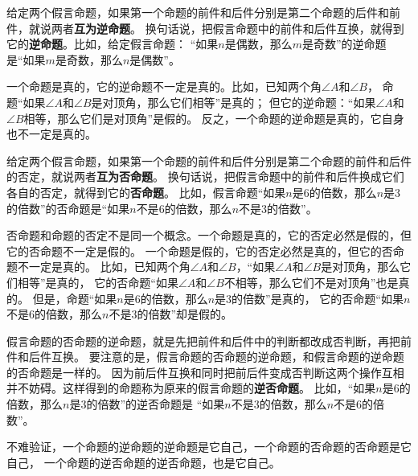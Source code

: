 \documentclass[12pt,UTF8,fontset=none]{ctexbook}
\begin{document}
给定两个假言命题，如果第一个命题的前件和后件分别是第二个命题的后件和前件，就说两者\textbf{互为逆命题}。
换句话说，把假言命题中的前件和后件互换，就得到它的\textbf{逆命题}。比如，给定假言命题：
“如果$n$是偶数，那么$m$是奇数”的逆命题是“如果$m$是奇数，那么$n$是偶数”。

一个命题是真的，它的逆命题不一定是真的。比如，已知两个角$\angle A$和$\angle B$，
命题“如果$\angle A$和$\angle B$是对顶角，那么它们相等”是真的；
但它的逆命题：“如果$\angle A$和$\angle B$相等，那么它们是对顶角”是假的。
反之，一个命题的逆命题是真的，它自身也不一定是真的。

给定两个假言命题，如果第一个命题的前件和后件分别是第二个命题的前件和后件的否定，就说两者\textbf{互为否命题}。
换句话说，把假言命题中的前件和后件换成它们各自的否定，就得到它的\textbf{否命题}。
比如，假言命题“如果$n$是$6$的倍数，那么$n$是$3$的倍数”的否命题是“如果$n$不是$6$的倍数，那么$n$不是$3$的倍数”。

否命题和命题的否定不是同一个概念。一个命题是真的，它的否定必然是假的，但它的否命题不一定是假的。
一个命题是假的，它的否定必然是真的，但它的否命题不一定是真的。
比如，已知两个角$\angle A$和$\angle B$，“如果$\angle A$和$\angle B$是对顶角，那么它们相等”是真的，
它的否命题“如果$\angle A$和$\angle B$不相等，那么它们不是对顶角”也是真的。
但是，命题“如果$n$是$6$的倍数，那么$n$是$3$的倍数”是真的，
它的否命题“如果$n$不是$6$的倍数，那么$n$不是$3$的倍数”却是假的。

假言命题的否命题的逆命题，就是先把前件和后件中的判断都改成否判断，再把前件和后件互换。
要注意的是，假言命题的否命题的逆命题，和假言命题的逆命题的否命题是一样的。
因为前后件互换和同时把前后件变成否判断这两个操作互相并不妨碍。这样得到的命题称为原来的假言命题的\textbf{逆否命题}。
比如，“如果$n$是$6$的倍数，那么$n$是$3$的倍数”的逆否命题是
“如果$n$不是$3$的倍数，那么$n$不是$6$的倍数”。

不难验证，一个命题的逆命题的逆命题是它自己，一个命题的否命题的否命题是它自己，
一个命题的逆否命题的逆否命题，也是它自己。
\end{document}
